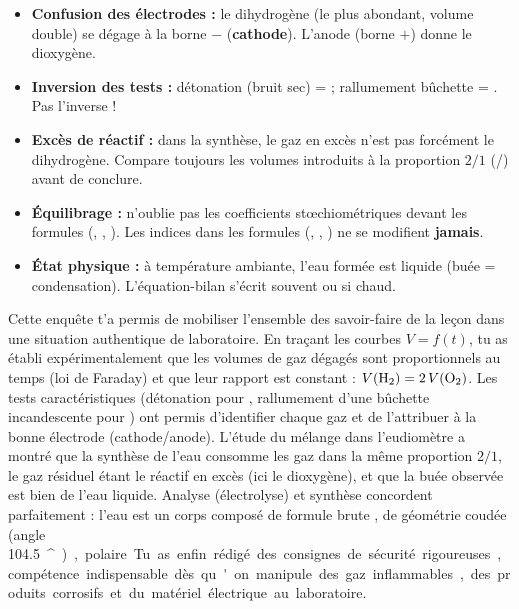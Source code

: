 \documentclass[11pt]{article}
\providecommand{\degree}{^{\circ}}
\newcounter{popsec}
\newcounter{popsub}
\newcommand{\courssub}[1]{%
  \stepcounter{popsub}%
  \par\vspace{9pt}\noindent{\popxbold\fontsize{11.5}{13}\selectfont\color{popink}{\color{poporange}\thepopsec.\thepopsub}\hspace{6pt}#1}\par\nopagebreak\vspace{4pt}
}
\begin{document}
\begin{attention}
\begin{itemize}
\item \textbf{Confusion des électrodes :} le dihydrogène (le plus abondant, volume double) se dégage à la borne $-$ (\textbf{cathode}). L'anode (borne $+$) donne le dioxygène.
\item \textbf{Inversion des tests :} détonation (bruit sec) =  ; rallumement bûchette = . Pas l'inverse !
\item \textbf{Excès de réactif :} dans la synthèse, le gaz en excès n'est pas forcément le dihydrogène. Compare toujours les volumes introduits à la proportion $2/1$ (/) avant de conclure.
\item \textbf{Équilibrage :} n'oublie pas les coefficients stœchiométriques devant les formules (, , ). Les indices dans les formules (, , ) ne se modifient \textbf{jamais}.
\item \textbf{État physique :} à température ambiante, l'eau formée est liquide (buée = condensation). L'équation-bilan s'écrit souvent  ou  si chaud.
\end{itemize}
\end{attention}

\courssub{Bilan de l'activité}

Cette enquête t'a permis de mobiliser l'ensemble des savoir-faire de la leçon dans une situation authentique de laboratoire. En traçant les courbes $V=f(t)$, tu as établi expérimentalement que les volumes de gaz dégagés sont proportionnels au temps (loi de Faraday) et que leur rapport est constant : $V(\ce{H2}) = 2\,V(\ce{O2})$. Les tests caractéristiques (détonation pour , rallumement d'une bûchette incandescente pour ) ont permis d'identifier chaque gaz et de l'attribuer à la bonne électrode (cathode/anode). L'étude du mélange dans l'eudiomètre a montré que la synthèse de l'eau consomme les gaz dans la même proportion $2/1$, le gaz résiduel étant le réactif en excès (ici le dioxygène), et que la buée observée est bien de l'eau liquide. Analyse (électrolyse) et synthèse concordent parfaitement : l'eau est un corps composé de formule brute , de géométrie coudée (angle \SI{104,5}{\degree}), polaire. Tu as enfin rédigé des consignes de sécurité rigoureuses, compétence indispensable dès qu'on manipule des gaz inflammables, des produits corrosifs et du matériel électrique au laboratoire.
\end{document}
